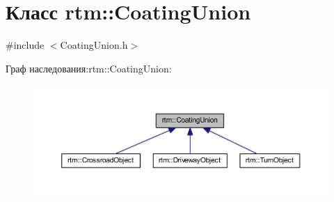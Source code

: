 \hypertarget{classrtm_1_1_coating_union}{}\section{Класс rtm\+:\+:Coating\+Union}
\label{classrtm_1_1_coating_union}


{\ttfamily \#include $<$Coating\+Union.\+h$>$}



Граф наследования\+:rtm\+:\+:Coating\+Union\+:
\nopagebreak
\begin{figure}[H]
\begin{center}
\leavevmode
\includegraphics[width=350pt]{classrtm_1_1_coating_union__inherit__graph}
\end{center}
\end{figure}

